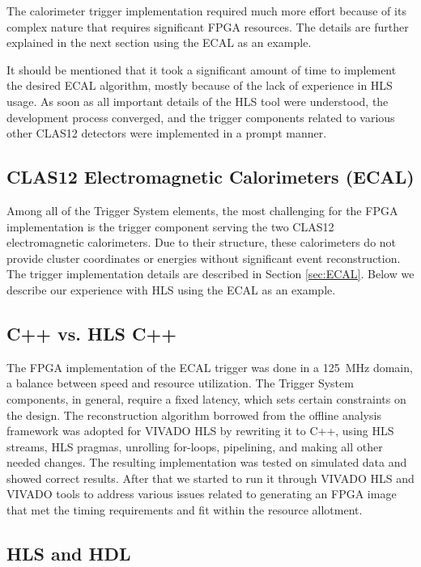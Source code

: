 The calorimeter trigger implementation required much more effort because of its complex nature that requires
significant FPGA resources. The details are further explained in the next section using the ECAL as an example.

It should be mentioned that it took a significant amount of time to implement the desired ECAL algorithm,
mostly because of the lack of experience in HLS usage. As soon as all important details of the HLS tool were
understood, the development process converged, and the trigger components related to various other CLAS12
detectors were implemented in a prompt manner.

\subsection{CLAS12 Electromagnetic Calorimeters (ECAL)}

Among all of the Trigger System elements, the most challenging for the FPGA implementation is the trigger
component serving the two CLAS12 electromagnetic calorimeters. Due to their structure, these calorimeters
do not provide cluster coordinates or energies without significant event reconstruction. The trigger
implementation details are described in Section \ref{sec:ECAL}. Below we describe our experience with HLS
using the ECAL as an example.

\subsection{C++ vs. HLS C++}

The FPGA implementation of the ECAL trigger was done in a 125~MHz domain, a balance between speed and
resource utilization. The Trigger System components, in general, require a fixed latency, which sets certain
constraints on the design. The reconstruction algorithm borrowed from the offline analysis framework was
adopted for VIVADO HLS by rewriting it to C++, using HLS streams, HLS pragmas, unrolling for-loops,
pipelining, and making all other needed changes. The resulting implementation was tested on simulated data
and showed correct results. After that we started to run it through VIVADO HLS and VIVADO tools to
address various issues related to generating an FPGA image that met the timing requirements and fit within
the resource allotment.

\subsection{HLS and HDL}

